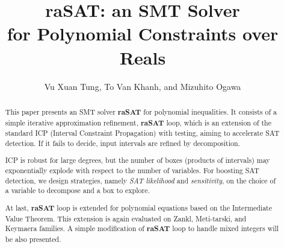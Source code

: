 \documentclass[runningheads,a4paper,oribibl]{llncs}
\begin{document}
%
\title{raSAT: an SMT Solver \\ for Polynomial Constraints over Reals}

\author{Vu Xuan Tung, To Van Khanh, and Mizuhito Ogawa} 


\maketitle

\begin{abstract}
This paper presents an SMT %
solver {\bf raSAT} for polynomial inequalities. 
It consists of a simple iterative approximation refinement, {\bf raSAT} loop, 
which is an extension of the standard ICP (Interval Constraint Propagation) with testing, 
aiming to accelerate SAT detection. 
If it fails to decide, input intervals are refined by decomposition. 

ICP is robust for large degrees, but the number of boxes (products of intervals) 
may exponentially explode with respect to the number of variables. 
For boosting SAT detection, we design strategies, namely {\em SAT likelihood} and {\em sensitivity}, on the choice of a variable to decompose
and a box to explore. 

At last, {\bf raSAT} loop is extended for polynomial equations based on the Intermediate Value Theorem. 
This extension is again evaluated on Zankl, Meti-tarski, and Keymaera families.
A simple modification of \textbf{raSAT} loop to handle mixed integers will be also presented. 
\end{abstract}


%
\end{document}
